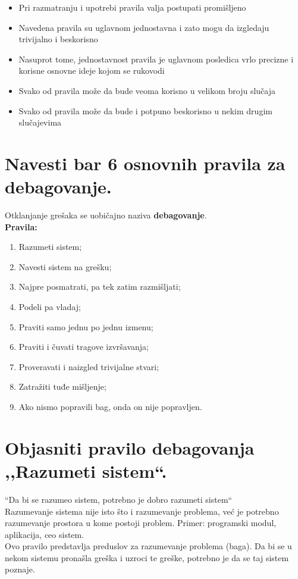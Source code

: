 \documentclass[a4paper]{article}
\begin{document}
   \begin{itemize}
        \item Pri razmatranju i upotrebi pravila valja postupati promišljeno
        \item Navedena pravila su uglavnom jednostavna i zato mogu da izgledaju trivijalno i beskorisno
        \item Nasuprot tome, jednostavnost pravila je uglavnom posledica vrlo precizne i korisne osnovne ideje kojom se rukovodi
        \item Svako od pravila može da bude veoma korisno u velikom broju slučaja
        \item Svako od pravila može da bude i potpuno beskorisno u nekim drugim slučajevima
   \end{itemize}

\section{Navesti bar 6 osnovnih pravila za debagovanje.}
  Otklanjanje grešaka se uobičajno naziva \textbf{debagovanje}.\\

  \textbf{Pravila:}
  \begin{enumerate}
    \item Razumeti sistem;
    \item Navesti sistem na grešku;
    \item Najpre posmatrati, pa tek zatim razmišljati;
    \item Podeli pa vladaj;
    \item Praviti samo jednu po jednu izmenu;
    \item Praviti i čuvati tragove izvršavanja;
    \item Proveravati i naizgled trivijalne stvari;
    \item Zatražiti tuđe mišljenje;
    \item Ako nismo popravili bag, onda on nije popravljen.
  \end{enumerate}

\section{Objasniti pravilo debagovanja ,,Razumeti sistem``.}
  ``Da bi se razumeo sistem, potrebno je dobro razumeti sistem``\\

  Razumevanje sistema nije isto što i razumevanje problema, već je potrebno razumevanje
  prostora u kome postoji problem. Primer: programski modul, aplikacija, ceo sistem.\\
  \indent Ovo pravilo predstavlja preduslov za razumevanje problema (baga). Da bi se u nekom
  sistemu pronašla greška i uzroci te greške, potrebno je da se taj sistem poznaje.\\
\end{document}
